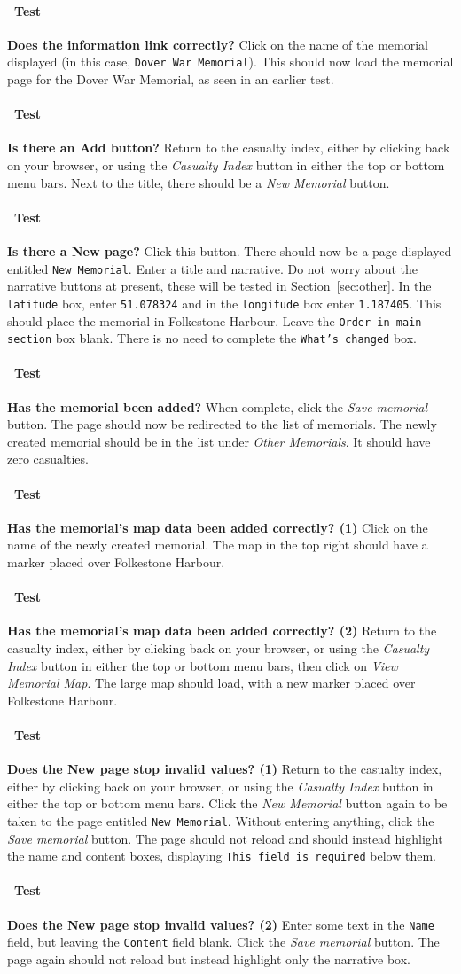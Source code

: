 \documentclass[12pt]{article}
\newcounter{Test}
\newcommand{\test}[1]{%
\stepcounter{Test}%
\paragraph{\Circle\ Test \theTest} \textbf{#1} }
\begin{document}
\test{Does the information link correctly?}
Click on the name of the memorial displayed (in this case, \texttt{Dover War Memorial}). This should now load the memorial page for the Dover War Memorial, as seen in an earlier test.

\test{Is there an Add button?}
Return to the casualty index, either by clicking back on your browser, or using the \textit{Casualty Index} button in either the top or bottom menu bars. Next to the title, there should be a \textit{New Memorial} button.

\test{Is there a New page?}
Click this button. There should now be a page displayed entitled \texttt{New Memorial}. Enter a title and narrative. Do not worry about the narrative buttons at present, these will be tested in Section~\ref{sec:other}. In the \texttt{latitude} box, enter \texttt{51.078324} and in the \texttt{longitude} box enter \texttt{1.187405}. This should place the memorial in Folkestone Harbour. Leave the \texttt{Order in main section} box blank. There is no need to complete the \texttt{What's changed} box.

\test{Has the memorial been added?}
When complete, click the \textit{Save memorial} button. The page should now be redirected to the list of memorials. The newly created memorial should be in the list under \textit{Other Memorials}. It should have zero casualties.

\test{Has the memorial's map data been added correctly? (1)}
Click on the name of the newly created memorial. The map in the top right should have a marker placed over Folkestone Harbour.

\test{Has the memorial's map data been added correctly? (2)}
Return to the casualty index, either by clicking back on your browser, or using the \textit{Casualty Index} button in either the top or bottom menu bars, then click on \textit{View Memorial Map}. The large map should load, with a new marker placed over Folkestone Harbour. 

\test{Does the New page stop invalid values? (1)}
Return to the casualty index, either by clicking back on your browser, or using the \textit{Casualty Index} button in either the top or bottom menu bars. Click the \textit{New Memorial} button again to be taken to the page entitled \texttt{New Memorial}. Without entering anything, click the \textit{Save memorial} button. The page should not reload and should instead highlight the name and content boxes, displaying \texttt{This field is required} below them.

\test{Does the New page stop invalid values? (2)}
Enter some text in the \texttt{Name} field, but leaving the \texttt{Content} field blank. Click the \textit{Save memorial} button. The page again should not reload but instead highlight only the narrative box.
\end{document}
